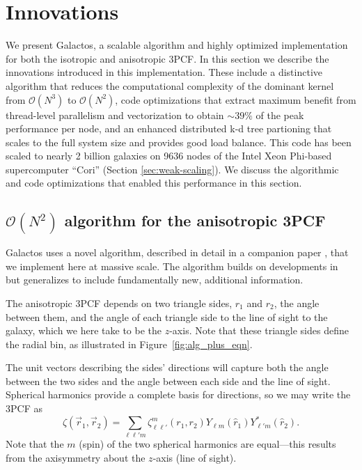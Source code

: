 \section{Innovations}
We present Galactos, a scalable algorithm and highly optimized implementation for both the isotropic and anisotropic 3PCF. In this section we describe the innovations introduced in this implementation. 
These include a distinctive algorithm that reduces the computational complexity of the dominant kernel from  $\mathcal{O}(N^3)$ to $\mathcal{O}(N^2)$, code optimizations that extract maximum benefit from thread-level parallelism and vectorization to obtain $\sim\!39\%$ of the peak performance per node,
and an enhanced  distributed k-d tree partioning that scales to the full system size and provides good load balance. This code has been scaled to nearly 2 billion galaxies on 9636 nodes of the Intel Xeon Phi-based supercomputer ``Cori'' (Section \ref{sec:weak-scaling}).  We discuss the algorithmic and code optimizations that enabled this performance in this section.

\subsection{$\mathcal{O}(N^2)$ algorithm for the anisotropic 3PCF}
\label{sec:a3PCF}

Galactos uses a novel algorithm, described in detail in a companion paper \cite{SE3ptAniso}, that we implement here at massive scale. The algorithm builds on developments in~\cite{SE3ptalg}  but generalizes to include fundamentally new, additional information.

The anisotropic 3PCF depends on two triangle sides, $r_1$ and $r_2$, the angle between them, 
and the angle of each triangle side to the line of sight to the galaxy, which we here take to be the $z$-axis. 
Note that these triangle sides define the radial bin, as illustrated in  Figure~\ref{fig:alg_plus_eqn}. 

The unit vectors describing the sides' directions will capture both the angle between the two sides and the angle between each side and the line of sight.  Spherical harmonics provide a complete basis for directions, so we may write the 3PCF as
\begin{equation*}
\zeta(\vec{r}_1,\vec{r}_2)=\sum_{\ell \ell' m}\zeta_{\ell\ell'}^m(r_1,r_2)Y_{\ell m}(\hat{r}_1)Y^*_{\ell' m}(\hat{r}_2).
\end{equation*}
Note that the $m$ (spin) of the two spherical harmonics are equal---this results from the axisymmetry about the $z$-axis (line of sight). 

